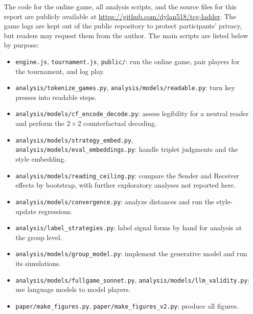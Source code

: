 \documentclass[stu,11pt,floatsintext,donotrepeattitle]{apa7}
\begin{document}
The code for the online game, all analysis scripts, and the source files for this report are publicly available at \url{https://github.com/dylan518/tcg-ladder}. The game logs are kept out of the public repository to protect participants' privacy, but readers may request them from the author. The main scripts are listed below by purpose:
\begin{itemize}
\item \texttt{engine.js}, \texttt{tournament.js}, \texttt{public/}: run the online game, pair players for the tournament, and log play.
\item \texttt{analysis/tokenize\_games.py}, \texttt{analysis/models/readable.py}: turn key presses into readable steps.
\item \texttt{analysis/models/cf\_encode\_decode.py}: assess legibility for a neutral reader and perform the $2 \times 2$ counterfactual decoding.
\item \texttt{analysis/models/strategy\_embed.py}, \texttt{analysis/models/eval\_embeddings.py}: handle triplet judgments and the style embedding.
\item \texttt{analysis/models/reading\_ceiling.py}: compare the Sender and Receiver effects by bootstrap, with further exploratory analyses not reported here.
\item \texttt{analysis/models/convergence.py}: analyze distances and run the style-update regressions.
\item \texttt{analysis/label\_strategies.py}: label signal forms by hand for analysis at the group level.
\item \texttt{analysis/models/group\_model.py}: implement the generative model and run its simulations.
\item \texttt{analysis/models/fullgame\_sonnet.py}, \texttt{analysis/models/llm\_validity.py}: use language models to model players.
\item \texttt{paper/make\_figures.py}, \texttt{paper/make\_figures\_v2.py}: produce all figures.
\end{itemize}
\end{document}
